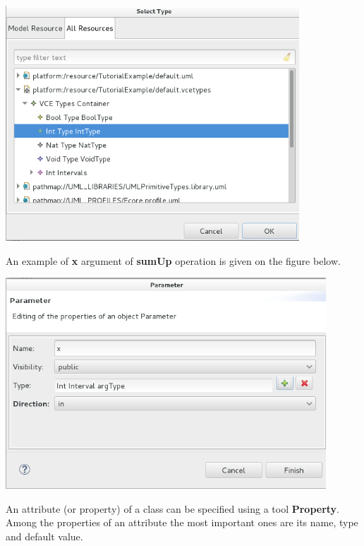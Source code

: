\documentclass[12pt]{article}
\begin{document}
\begin{enumerate}
     \centerline{
     \includegraphics[width=11cm]{draws/param-type.png}
     \label{fig:vce-proj}
     }

An example of \textbf{x} argument of \textbf{sumUp} operation is given on the figure below.

     \centerline{
     \includegraphics[width=12cm]{draws/param.png}
     \label{fig:vce-proj}
     }

\end{enumerate}

An attribute (or  property) of a class can be specified using a tool \textbf{Property}. Among the properties of an attribute the most important ones are its name, type and default value.
\end{document}
